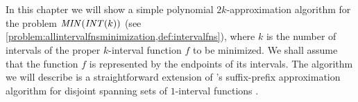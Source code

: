 \chapter{}
\label{chap:2kapprox}

In this chapter
we will show a simple polynomial
$2k$-approximation algorithm for the problem
$\mathit{MIN} (\mathit{INT} (k))$
(see
\cref{problem:allintervalfnsminimization,def:intervalfns}),
where $k$ is the number of intervals
of the proper $k$-interval function $f$ to be minimized.
We shall assume that the function $f$ is represented by the endpoints of its intervals.
The algorithm we will describe is a straightforward
extension of
\citeauthor{Schieber2005154}'s suffix-prefix
approximation algorithm
for disjoint spanning sets of $1$-interval functions
\citep[Section 6]{Schieber2005154}.

\section{\algdesctitle}

